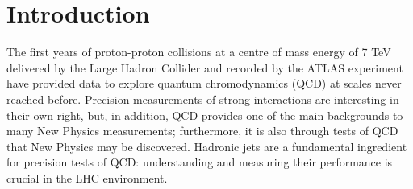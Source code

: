 
\chapter{Introduction}

The first years of proton-proton collisions at a centre of mass energy of 7 TeV delivered by
the Large Hadron Collider and recorded by the ATLAS experiment have provided data to
explore quantum chromodynamics (QCD) at scales never reached before. Precision measurements of strong interactions are interesting in their own right, but, in addition, QCD provides one of the main
backgrounds to many New Physics measurements; furthermore, it is also through tests of QCD
that New Physics may be discovered. Hadronic jets are a fundamental ingredient for precision
tests of QCD: understanding and measuring their performance is crucial in the LHC environment. %



